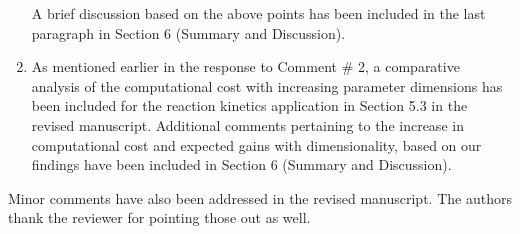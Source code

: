 \documentclass[11pt,final]{article}
\newcommand{\referee}[1]{\vspace{.1ex}\noindent{\textcolor{blue}{#1}}}
\begin{document}
\begin{enumerate}

A brief discussion based on the above points has been included in the
last paragraph in Section 6 (Summary and Discussion).

\item 
\referee{The reviewer would like to see some comments on the change of computational
cost of the proposed approach with respect to the increase of parameter dimensions.}

As mentioned earlier in the response to Comment $\#$ 2, a comparative analysis of the
computational cost with increasing parameter dimensions has been included for the reaction
kinetics application in Section 5.3 in the revised manuscript. Additional comments pertaining
to the increase in computational cost and expected gains with dimensionality, based on
our findings have been included in Section 6 (Summary and Discussion).

\end{enumerate}

Minor comments have also been addressed in the revised manuscript. The authors thank
the reviewer for pointing those out as well. 
\end{document}
